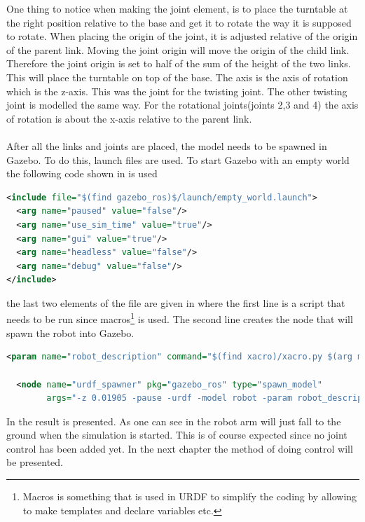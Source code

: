 One thing to notice when making the joint element, is to place the turntable at the right position relative to the base and get it to rotate the way it is supposed to rotate. When placing the origin of the joint, it is adjusted relative of the origin of the parent link. Moving the joint origin will move the origin of the child link. Therefore the joint origin is set to half of the sum of the height of the two links. This will place the turntable on top of the base. The axis is the axis of rotation which is the z-axis. This was the joint for the twisting joint. The other twisting joint is modelled the same way. For the rotational joints(joints 2,3 and 4) the axis of rotation is about the x-axis relative to the parent link. \\\\
After all the links and joints are placed, the model needs to be spawned in Gazebo. To do this, launch files are used. To start Gazebo with an empty world the following code shown in  is used
\begin{lstlisting}[language=xml,caption={Start Gazebo with empty world},label={lst:empty}]
<include file="$(find gazebo_ros)$/launch/empty_world.launch">
  <arg name="paused" value="false"/>
  <arg name="use_sim_time" value="true"/>
  <arg name="gui" value="true"/>
  <arg name="headless" value="false"/>
  <arg name="debug" value="false"/>
</include>
\end{lstlisting}
the last two elements of the file are given in  where the first line is a script that needs to be run since macros\footnote{Macros is something that is used in URDF to simplify the coding by allowing to make templates and declare variables etc.} is used. The second line creates the node that will spawn the robot into Gazebo. 
\begin{lstlisting}[caption={Spawn robot model in Gazebo},label={lst:l2},language=xml]
  <param name="robot_description" command="$(find xacro)/xacro.py $(arg model)" />

  <node name="urdf_spawner" pkg="gazebo_ros" type="spawn_model"
        args="-z 0.01905 -pause -urdf -model robot -param robot_description" respawn="false" output="screen" />
\end{lstlisting}
In  the result is presented. As one can see in  the robot arm will just fall to the ground when the simulation is started. This is of course expected since no joint control has been added yet. In the next chapter the method of doing control will be presented. 

